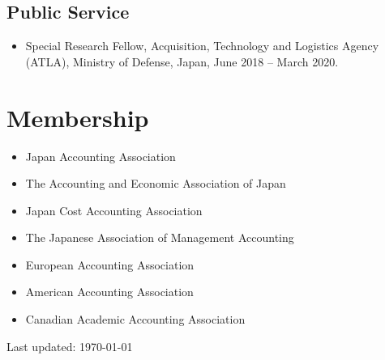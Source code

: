 \documentclass[letterpaper,11pt]{article}
\begin{document}
\subsection*{Public Service}

\begin{itemize}
\item Special Research Fellow, Acquisition, Technology and Logistics Agency (ATLA), Ministry of Defense, Japan, June 2018 -- March 2020.
\end{itemize}

\section*{Membership}

\begin{itemize}
\item Japan Accounting Association
\item The Accounting and Economic Association of Japan
\item Japan Cost Accounting Association
\item The Japanese Association of Management Accounting
\item European Accounting Association
\item American Accounting Association
\item Canadian Academic Accounting Association
\end{itemize}

\bigskip

\begin{center}
  \begin{footnotesize}
    \textcolor{rulegray}{Last updated: \today}
  \end{footnotesize}
\end{center}
\end{document}
